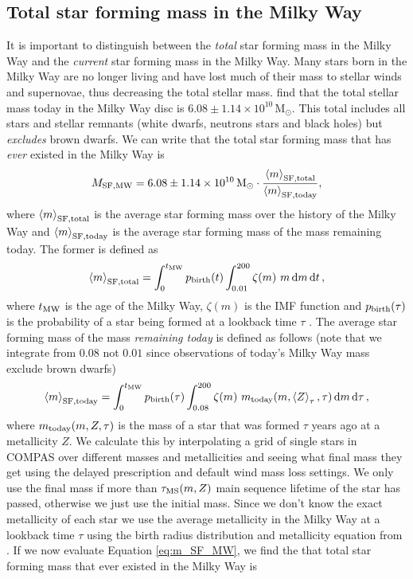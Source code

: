 \documentclass[twocolumn]{aastex63}
\newcommand{\Msun}{\ensuremath{\,\mathrm{M_\odot}}\xspace} %
\newcommand{\avg}[1]{\left\langle#1\right\rangle}
\begin{document}
\subsection{Total star forming mass in the Milky Way}
It is important to distinguish between the \textit{total} star forming mass in the Milky Way and the \textit{current} star forming mass in the Milky Way. Many stars born in the Milky Way are no longer living and have lost much of their mass to stellar winds and supernovae, thus decreasing the total stellar mass. \citet{Licquia&Newman2014} find that the total stellar mass today in the Milky Way disc is $6.08 \pm 1.14 \times 10^{10} \Msun$. This total includes all stars and stellar remnants (white dwarfs, neutrons stars and black holes) but \textit{excludes} brown dwarfs. We can write that the total star forming mass that has \textit{ever} existed in the Milky Way is
\begin{equation}\label{eq:m_SF_MW}
    M_{\rm SF, MW} = 6.08 \pm 1.14 \times 10^{10} \Msun \cdot \frac{\avg{m}_{\rm SF, total}}{\avg{m}_{\rm SF, today}},
\end{equation}
where $\avg{m}_{\rm SF, total}$ is the average star forming mass over the history of the Milky Way and $\avg{m}_{\rm SF, today}$ is the average star forming mass of the mass remaining today. The former is defined as
\begin{equation}
    \avg{m}_{\rm SF, total} = \int_{0}^{t_{\rm MW}} p_{\rm birth}(t) \int_{0.01}^{200} \zeta(m)\ m \dd{m} \dd{t},
\end{equation}
where $t_{\rm MW}$ is the age of the Milky Way, $\zeta(m)$ is the \citet{Kroupa2001} IMF function and $p_{\rm birth}(\tau)$ is the probability of a star being formed at a lookback time $\tau$ \citep[][Eq.\,4]{Frankel+2018}. The average star forming mass of the mass \textit{remaining today} is defined as follows (note that we integrate from $0.08$ not $0.01$ since observations of today's Milky Way mass exclude brown dwarfs)
\begin{equation}
    \avg{m}_{\rm SF, today} = \int_{0}^{t_{\rm MW}} p_{\rm birth}(\tau) \int_{0.08}^{200} \zeta(m)\ m_{\rm today}(m, \avg{Z}_\tau, \tau) \dd{m} \dd{\tau},
\end{equation}
where $m_{\rm today}(m, Z, \tau)$ is the mass of a star that was formed $\tau$ years ago at a metallicity $Z$. We calculate this by interpolating a grid of single stars in COMPAS over different masses and metallicities and seeing what final mass they get using the \citet{Fryer+2012} delayed prescription and default wind mass loss settings. We only use the final mass if more than $\tau_{\rm MS}(m, Z)$ main sequence lifetime of the star has passed, otherwise we just use the initial mass. Since we don't know the exact metallicity of each star we use the average metallicity in the Milky Way at a lookback time $\tau$ using the birth radius distribution and metallicity equation from \citet{Frankel+2018}. If we now evaluate Equation \ref{eq:m_SF_MW}, we find the that total star forming mass that ever existed in the Milky Way is
\end{document}
